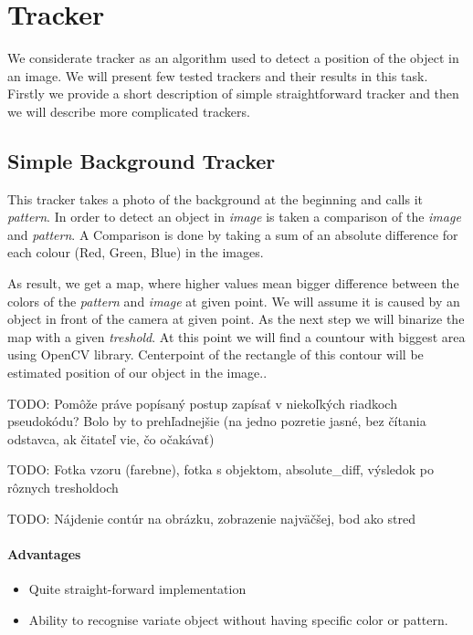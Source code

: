 \chapter{Tracker}

We considerate tracker as an algorithm used to detect a position of the object in
an image. We will present few tested trackers and their results in this task.
Firstly we provide a short description of simple straightforward tracker and
then we will describe more complicated trackers.


\section{Simple Background Tracker}

This tracker takes a photo of the background at the beginning and calls it
\emph{pattern}. In order to detect an object in \emph{image} is taken a
comparison of the \emph{image} and \emph{pattern}. A Comparison is done by
taking a sum of an absolute difference for each colour (Red, Green, Blue) in
the images. 

As result, we get a map, where higher values mean bigger difference between the
colors of the \emph{pattern} and \emph{image} at given point. We will assume it
is caused by an object in front of the camera at given point.  As the next step
we will binarize the map with a given \emph{treshold}. At this point we will
find a countour with biggest area using OpenCV library. Centerpoint of the
rectangle of this contour will be estimated position of our object in the
image..

TODO: Pomôže práve popísaný postup zapísať v niekoľkých riadkoch pseudokódu? Bolo
by to prehľadnejšie (na jedno pozretie jasné, bez čítania odstavca, ak čitateľ
vie, čo očakávať)

TODO: Fotka vzoru (farebne), fotka s objektom, absolute\_diff, výsledok po rôznych tresholdoch

TODO: Nájdenie contúr na obrázku, zobrazenie najväčšej, bod ako stred

\subsubsection{Advantages}
\begin{itemize}
\item Quite straight-forward implementation
\item Ability to recognise variate object without having specific color or pattern.
\end{itemize}

